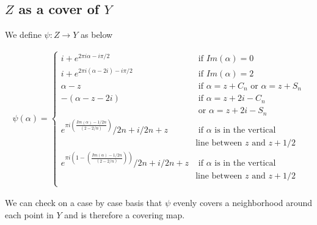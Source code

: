 \documentclass[twocolumn]{article}
\begin{document}
\subsection{$Z$ as a cover of $Y$}
We define $\psi:Z\to Y$ as below
\begin{footnotesize}
\begin{align*}
	\psi(\alpha)=\begin{cases}
		i+e^{2\pi i\alpha-i\pi/2}&\text{ if }Im(\alpha)=0\\
		i+e^{2\pi i(\alpha-2i)-i\pi/2}&\text{ if }Im(\alpha)=2\\
		\alpha-z&\text{ if }\alpha= z+C_n\text{ or }\alpha= z+S_n\\
		-(\alpha-z-2i)&\text{ if }\alpha= z+2i-C_{n}\\
		&\text{ or }\alpha= z+2i-S_{n}\\
		e^{\pi i\left(\frac{Im(\alpha)-1/2n}{(2-2/n)}\right)}/2n+i/2n+z&\text{ if }\alpha\text{ is in the vertical }\\
		&\text{line between $z$ and $z+1/2$}\\
		e^{\pi i\left(1-\left(\frac{Im(\alpha)-1/2n}{(2-2/n)}\right)\right)}/2n+i/2n+z&\text{ if }\alpha\text{ is in the vertical }\\
		&\text{line between $z$ and $z+1/2$}\\
	\end{cases}
\end{align*}
\end{footnotesize}
We can check on a case by case basis that $\psi$  evenly covers a neighborhood around each point in $Y$ and is therefore a covering map. 
\end{document}

